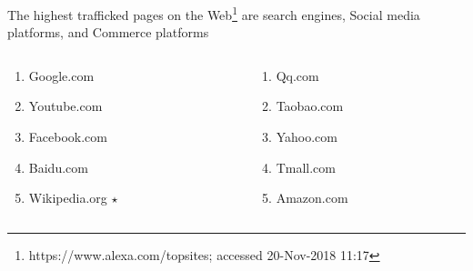 \documentclass[aspectratio=169]{beamer}
\newcounter{savedenum}
\newcommand*{\saveenum}{\setcounter{savedenum}{\theenumi}}
\newcommand*{\resume}{\setcounter{enumi}{\thesavedenum}}
\begin{document}
{
%
\begin{frame}
%
The highest trafficked pages on the Web\footnote{https://www.alexa.com/topsites; accessed 20-Nov-2018 11:17} are search engines, Social media platforms, and Commerce platforms
\begin{center}
\begin{columns}[T]
  \begin{column}{.3\linewidth}
  \begin{enumerate}
	\item{Google.com}
	\item{Youtube.com}
	\item{Facebook.com}
	\item{Baidu.com}
	\item{Wikipedia.org $\star$}
    \saveenum
  \end{enumerate}
  \end{column}
  \begin{column}{.3\linewidth}
  \begin{enumerate}
    \resume
         \item{Qq.com}
	\item{Taobao.com}
	\item{Yahoo.com}
	\item{Tmall.com}
	\item{Amazon.com}  
	\end{enumerate}
  \end{column}
\end{columns}
\end{center}
%
\end{frame}
}
\end{document}
